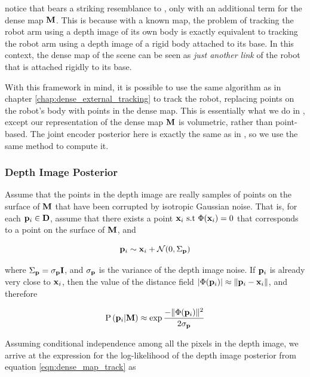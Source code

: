 \noindent notice that  bears a striking resemblance to , only with an additional term for the dense map $\mathbf{M}$. This is because with a known map, the problem of tracking the robot arm using a depth image of its own body is exactly equivalent to tracking the robot arm using a depth image of a rigid body attached to its base. In this context, the dense map of the scene can be seen as \textit{just another link} of the robot that is attached rigidly to its base.

With this framework in mind, it is possible to use the same algorithm as in chapter \ref{chap:dense_external_tracking} to track the robot, replacing points on the robot's body with points in the dense map. This is essentially what we do in \cite{Klingensmith2016}, except our representation of the dense map $\mathbf{M}$ is volumetric, rather than point-based. The joint encoder posterior here is exactly the same as in , so we use the same method to compute it.

\subsubsection{Depth Image Posterior}
Assume that the points in the depth image are really samples of points on the surface of $\mathbf{M}$ that have been corrupted by isotropic Gaussian noise. That is, for each $\mathbf{p}_i \in \mathbf{D}$, assume that there exists a point $\mathbf{x}_i~\text{s.t}~ \Phi(\mathbf{x}_i) = 0$ that corresponds to a point on the surface of $\mathbf{M}$, and

\begin{equation}
	\mathbf{p}_i \sim \mathbf{x}_i + \mathcal{N}(0, \Sigma_{\mathbf{p}})
\end{equation}

\noindent where $\Sigma_{\mathbf{p}} = \sigma_{\mathbf{p}} \mathbf{I}$, and $\sigma_{\mathbf{p}}$ is the variance of the depth image noise. If $\mathbf{p}_i$ is already very close to $\mathbf{x}_i$, then the value of the distance field $|\Phi(\mathbf{p}_i)| \approx \|\mathbf{p}_i - \mathbf{x}_i\|$, and therefore

\begin{equation}
	\text{P}\left(\mathbf{p}_i | \mathbf{M}\right) \approx \exp{\frac{-\|\Phi(\mathbf{p}_i)\|^2}{2 \sigma_{\mathbf{p}}}}
\end{equation}

Assuming conditional independence among all the pixels in the depth image, we arrive at the expression for the log-likelihood of the depth image posterior from equation \ref{eqn:dense_map_track} as

